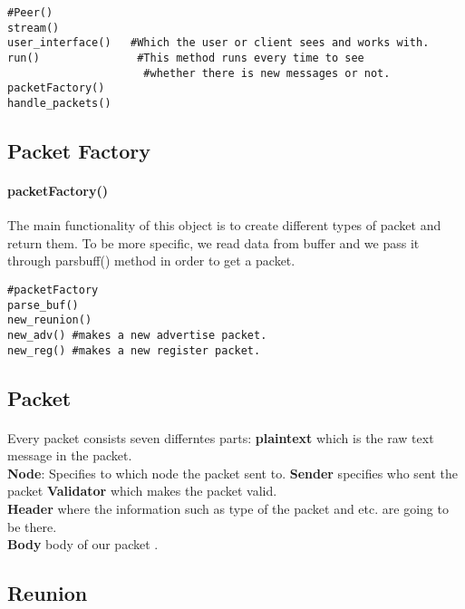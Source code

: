 \documentclass{article}
\begin{document}
\begin{lstlisting}
#Peer()
stream()
user_interface()   #Which the user or client sees and works with. 
run() 				#This method runs every time to see 
				     #whether there is new messages or not.
packetFactory()
handle_packets()
\end{lstlisting}
\subsection{Packet Factory}
\paragraph{packetFactory()}The main functionality of this object is to create different types of packet and return them. To be more specific, we read data from buffer and we pass it through pars\underline{\hspace{.05in}}buff() method in order to get a packet.
\begin{lstlisting}
#packetFactory
parse_buf()
new_reunion()
new_adv() #makes a new advertise packet.
new_reg() #makes a new register packet.
\end{lstlisting}
\subsection{Packet}
\paragraph{}Every packet consists seven differntes parts: \textbf{plain\underline{\hspace{.05in}}text} which is the raw text message in the packet.\\
\textbf{Node}: Specifies to which node the packet sent to. \textbf{Sender} specifies who sent the packet \textbf{Validator} which makes the packet valid.\\ \textbf{Header} where the information such as type of the packet and etc. are going to be there.\\ \textbf{Body} body of our packet .
\subsection{Reunion}
\end{document}
